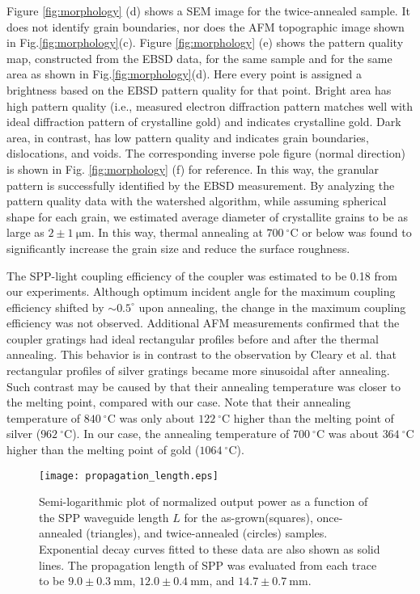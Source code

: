 \documentclass[aip,apl,reprint]{revtex4-1}
\begin{document}
Figure \ref{fig:morphology} (d) shows a SEM image for the twice-annealed sample. It does not identify grain boundaries, nor does the AFM topographic image shown in Fig.\ref{fig:morphology}(c).
Figure \ref{fig:morphology} (e) shows the pattern quality map, constructed from the EBSD data, for the same sample and for the same area as shown in Fig.\ref{fig:morphology}(d). Here every point is assigned a brightness based on the EBSD pattern quality for that point. Bright area has high pattern quality (i.e., measured electron diffraction pattern matches well with ideal diffraction pattern of crystalline gold) and indicates crystalline gold. Dark area, in contrast, has low pattern quality and indicates grain boundaries, dislocations, and voids. The corresponding inverse pole figure (normal direction) is shown in Fig. \ref{fig:morphology} (f) for reference. In this way, the granular pattern is successfully identified by the EBSD measurement. By analyzing the pattern quality data with the watershed algorithm\cite{Petr}, while assuming spherical shape for each grain, we estimated average diameter of crystallite grains to be as large as $2\pm1\:\mathrm{\mu m}$. In this way, thermal annealing at $700\:^\circ\mathrm{C}$ or below was found to significantly increase the grain size and reduce the surface roughness.

The SPP-light coupling efficiency of the coupler was estimated to be 0.18 from our experiments. Although optimum incident angle for the maximum coupling efficiency shifted by $\sim0.5^\circ$ upon annealing, the change in the maximum coupling efficiency was not observed. Additional AFM measurements confirmed that the coupler gratings had ideal rectangular profiles before and after the thermal annealing. 
This behavior is in contrast to the observation by Cleary et al.\cite{Cleary2010} that rectangular profiles of silver gratings became more sinusoidal after annealing. Such contrast may be caused by that their annealing temperature was closer to the melting point, compared with our case. Note that their annealing temperature of $840\:^\circ\mathrm{C}$ was only about $122\:^\circ\mathrm{C}$ higher than the melting point of silver ($962\:^\circ\mathrm{C}$). In our case, the annealing temperature of $700\:^\circ\mathrm{C}$ was about $364\:^\circ\mathrm{C}$ higher than the melting point of gold ($1064\:^\circ\mathrm{C}$).
 \begin{figure}
    \texttt{[image: propagation\_length.eps]}
    \caption{Semi-logarithmic plot of normalized output power as a function of the SPP waveguide length $L$ for the as-grown(squares), once-annealed (triangles), and twice-annealed (circles) samples. Exponential decay curves fitted to these data are also shown as solid lines. The propagation length of SPP was evaluated from each trace to be $9.0\pm0.3\:\mathrm{mm}$, $12.0\pm0.4\:\mathrm{mm}$, and $14.7\pm0.7\:\mathrm{mm}$.}
       \label{fig:propagation_length}
\end{figure}
\end{document}
